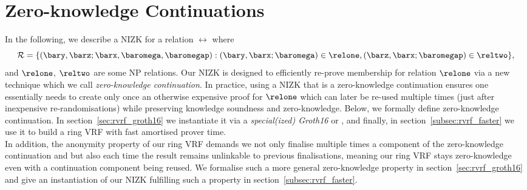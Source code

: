 \section{Zero-knowledge Continuations}
\label{sec:rvrf_cont}

\noindent In the following, we describe a NIZK for a relation $\rel$ where
$$\rel = \{(\bary, \barz; \barx, \baromega, \baromegap):  (\bary, \barx; \baromega) \in \relone, (\barz, \barx; \baromegap) \in \reltwo \},$$
and $\relone$, $\reltwo$ are some NP relations. Our NIZK is designed to efficiently re-prove membership for relation $\relone$
via a new technique which we call \emph{zero-knowledge continuation}. In practice, using a NIZK that is a zero-knowledge continuation 
ensures one essentially needs to create only once an otherwise expensive proof for $\relone$ which can later be 
re-used multiple times (just after inexpensive re-randomisations) while preserving knowledge soundness and zero-knowledge. 
Below, we formally define zero-knowledge continuation. In section~\ref{sec:rvrf_groth16} we instantiate it via a \emph{special(ized) 
Groth16} or \SpecialG, and finally, in section~\ref{subsec:rvrf_faster} we use it to build a ring VRF with fast amortised prover time. \\

\noindent In addition, the anonymity property of our ring VRF demands we not only finalise multiple times a component of the zero-knowledge 
continuation and but also each time the result remains unlinkable to previous finalisations, meaning our ring VRF stays zero-knowledge 
even with a continuation component being reused. We formalise such a more general zero-knowledge property in 
section~\ref{sec:rvrf_groth16} and give an instantiation of our NIZK fulfilling such a property in section~\ref{subsec:rvrf_faster}. 



